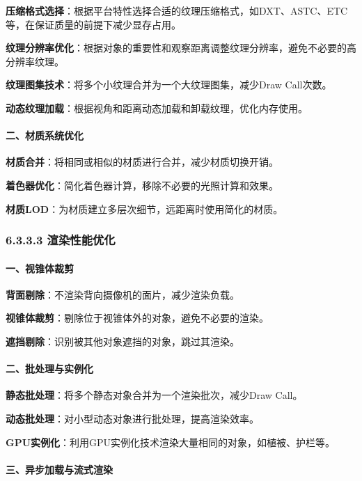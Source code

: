 \textbf{压缩格式选择}：根据平台特性选择合适的纹理压缩格式，如DXT、ASTC、ETC等，在保证质量的前提下减少显存占用。

\textbf{纹理分辨率优化}：根据对象的重要性和观察距离调整纹理分辨率，避免不必要的高分辨率纹理。

\textbf{纹理图集技术}：将多个小纹理合并为一个大纹理图集，减少Draw
Call次数。

\textbf{动态纹理加载}：根据视角和距离动态加载和卸载纹理，优化内存使用。

\paragraph{二、材质系统优化}\label{ux4e8cux6750ux8d28ux7cfbux7edfux4f18ux5316}

\textbf{材质合并}：将相同或相似的材质进行合并，减少材质切换开销。

\textbf{着色器优化}：简化着色器计算，移除不必要的光照计算和效果。

\textbf{材质LOD}：为材质建立多层次细节，远距离时使用简化的材质。

\subsubsection{6.3.3.3
渲染性能优化}\label{ux6e32ux67d3ux6027ux80fdux4f18ux5316}

\paragraph{一、视锥体裁剪}\label{ux4e00ux89c6ux9525ux4f53ux88c1ux526a}

\textbf{背面剔除}：不渲染背向摄像机的面片，减少渲染负载。

\textbf{视锥体裁剪}：剔除位于视锥体外的对象，避免不必要的渲染。

\textbf{遮挡剔除}：识别被其他对象遮挡的对象，跳过其渲染。

\paragraph{二、批处理与实例化}\label{ux4e8cux6279ux5904ux7406ux4e0eux5b9eux4f8bux5316}

\textbf{静态批处理}：将多个静态对象合并为一个渲染批次，减少Draw Call。

\textbf{动态批处理}：对小型动态对象进行批处理，提高渲染效率。

\textbf{GPU实例化}：利用GPU实例化技术渲染大量相同的对象，如植被、护栏等。

\paragraph{三、异步加载与流式渲染}\label{ux4e09ux5f02ux6b65ux52a0ux8f7dux4e0eux6d41ux5f0fux6e32ux67d3}


